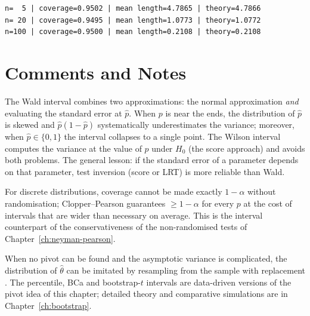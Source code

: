 \documentclass[main.tex]{subfiles}
\begin{document}
\begin{lstlisting}[style=output]
n=  5 | coverage=0.9502 | mean length=4.7865 | theory=4.7866
n= 20 | coverage=0.9495 | mean length=1.0773 | theory=1.0772
n=100 | coverage=0.9500 | mean length=0.2108 | theory=0.2108
\end{lstlisting}

\section{Comments and Notes}

\begin{remark}
The Wald interval combines two approximations: the normal approximation \emph{and} evaluating the standard error at $\hat p$. When $p$ is near the ends, the distribution of $\hat p$ is skewed and $\hat p(1-\hat p)$ systematically underestimates the variance; moreover, when $\hat p\in\{0,1\}$ the interval collapses to a single point. The Wilson interval computes the variance at the value of $p$ under $H_0$ (the score approach) and avoids both problems. The general lesson: if the standard error of a parameter depends on that parameter, test inversion (score or LRT) is more reliable than Wald.
\end{remark}

\begin{remark}
For discrete distributions, coverage cannot be made exactly $1-\alpha$ without randomisation; Clopper--Pearson guarantees $\ge1-\alpha$ for every $p$ at the cost of intervals that are wider than necessary on average. This is the interval counterpart of the conservativeness of the non-randomised tests of Chapter~\ref{ch:neyman-pearson}.
\end{remark}

\begin{remark}
When no pivot can be found and the asymptotic variance is complicated, the distribution of $\hat\theta$ can be imitated by resampling from the sample with replacement \cite{efron79}. The percentile, BCa and bootstrap-$t$ intervals are data-driven versions of the pivot idea of this chapter; detailed theory and comparative simulations are in Chapter~\ref{ch:bootstrap}.
\end{remark}
\end{document}
